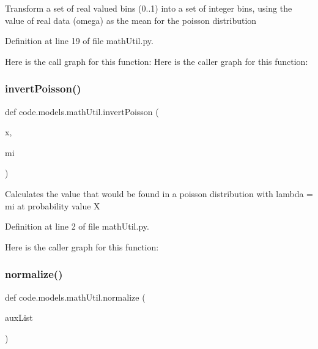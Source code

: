 \begin{DoxyVerb}Transform a set of real valued bins (0..1) into 
a set of integer bins, using the value of real data 
(omega) as the mean for the poisson distribution\end{DoxyVerb}
 

Definition at line 19 of file math\+Util.\+py.

Here is the call graph for this function\+:
Here is the caller graph for this function\+:
\mbox{\label{namespacecode_1_1models_1_1math_util_ac0f6efe45f2da086c1225392a228983e}} 
\subsubsection{\texorpdfstring{invert\+Poisson()}{invertPoisson()}}
{\footnotesize\ttfamily def code.\+models.\+math\+Util.\+invert\+Poisson (\begin{DoxyParamCaption}\item[{}]{x,  }\item[{}]{mi }\end{DoxyParamCaption})}

\begin{DoxyVerb}Calculates the value that would be found in a 
poisson distribution with lambda = mi at probability
value X
\end{DoxyVerb}
 

Definition at line 2 of file math\+Util.\+py.

Here is the caller graph for this function\+:
\mbox{\label{namespacecode_1_1models_1_1math_util_aaef089b43b3c89bcacb91765ef2b878a}} 
\subsubsection{\texorpdfstring{normalize()}{normalize()}}
{\footnotesize\ttfamily def code.\+models.\+math\+Util.\+normalize (\begin{DoxyParamCaption}\item[{}]{aux\+List }\end{DoxyParamCaption})}

